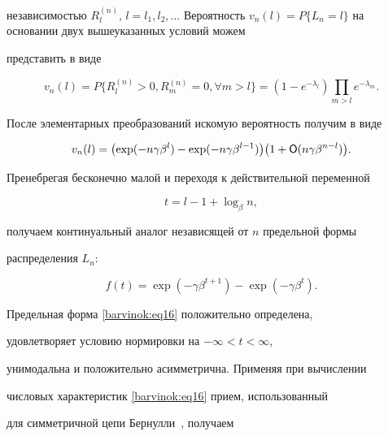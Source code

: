 независимостью $R_l^{(n)}$, $l=l_1,l_2,\ldots$ Вероятность $v_n

(l)=P\{L_n =l\}$ на основании двух вышеуказанных условий можем

представить в виде

\[

v_n (l)=P \{R_l^{(n)} >0,R_m^{(n)} =0,\forall

m>l\}=( 1-e^{-\lambda _l })\prod\limits_{m>l}

e^{-\lambda _m }.

\]

После элементарных преобразований искомую вероятность получим в виде

\begin{equation}

\label{barvinok:eq14} v_n (l)=\bigl( \exp (-n\gamma \beta ^l)-\exp

(-n\gamma \beta ^{l-1}) \bigr) \bigl( 1+{\sf O}( n\gamma \beta

^{n-l}) \bigr).

\end{equation}

Пренебрегая бесконечно малой и переходя к действительной переменной

\begin{equation}

\label{barvinok:eq15} t=l-1+\log_\beta n,

\end{equation}

получаем континуальный аналог независящей от $n$ предельной формы

распределения $L_n$:

\begin{equation}

\label{barvinok:eq16} f(t)=\exp (-\gamma \beta ^{t+1})-\exp

(-\gamma \beta^t).

\end{equation}



Предельная форма \eqref{barvinok:eq16} положительно определена,

удовлетворяет условию нормировки на $-\infty <t<\infty $,

унимодальна и положительно асимметрична. Применяя при вычислении

числовых характеристик \eqref{barvinok:eq16} прием, использованный

для симметричной цепи Бернулли~\cite{barvinok:bib7}, получаем

